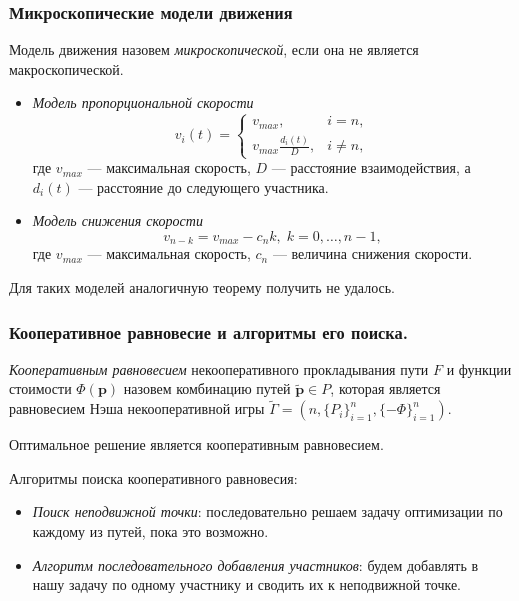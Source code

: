 \documentclass{beamer}
\begin{document}
\begin{frame}\frametitle{Микроскопические модели движения}
	 Модель движения назовем \textit{микроскопической}, если она не является макроскопической.
	
	\bigskip
	\begin{itemize}
		\item \textit{Модель пропорциональной скорости}
		\begin{equation}
			\label{eq:micro}
			v_i(t)=
			\begin{cases}
				v_{max}, & i = n,
				\\
				v_{max} \frac{d_i(t)}{D} ,& i \ne n,
			\end{cases}
		\end{equation}
	где $v_{max}$ --- максимальная скорость, $D$ --- расстояние взаимодействия, а $d_i(t)$ --- расстояние до следующего участника.
	
	\item \textit{Модель снижения скорости}
	\begin{equation}
		v_{n - k} = v_{max} - c_n k, \; k = 0, \dots, n - 1,
	\end{equation}
	где $v_{max}$ --- максимальная скорость, $c_n$ --- величина снижения скорости.
	\end{itemize}
	
	Для таких моделей аналогичную теорему получить не удалось.

\end{frame}

\begin{frame}\frametitle{Кооперативное равновесие и алгоритмы его поиска.}
\textit{Кооперативным равновесием} некооперативного прокладывания пути $F$ и функции стоимости $\Phi (\textbf{p})$ назовем комбинацию путей $\widetilde{\textbf{p}} \in P$, которая является равновесием Нэша некооперативной игры $\widetilde{\Gamma} = (n, \{P_i\}_{i = 1}^n, \{-\Phi\}_{i = 1}^n)$.

Оптимальное решение является кооперативным равновесием.

\bigskip
Алгоритмы поиска кооперативного равновесия:
\begin{itemize}
	\item \textit{Поиск неподвижной точки}: последовательно решаем задачу оптимизации по каждому из путей, пока это возможно. 
	\item  \textit{Алгоритм последовательного добавления участников}: будем добавлять в нашу задачу по одному участнику и сводить их к неподвижной точке.
\end{itemize}
\end{frame}
\end{document}
